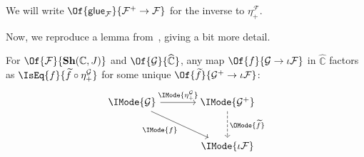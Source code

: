 \documentclass{article}
\newcommand\Psh[1]{\widehat{#1}}
\newcommand\Sh[1]{\mathbf{Sh} (#1)}
\newcommand\Plus[1]{{#1}^+}
\newcommand\Glue[1]{\mathsf{glue}_{#1}}
\begin{document}
\begin{notation}
  We will write
  $\Of{\Glue{\mathcal{F}}}{\Plus{\mathcal{F}}\to\mathcal{F}}$ for the
  inverse to $\eta_+^{\mathcal{F}}$.
\end{notation}

Now, we reproduce a lemma from~\cite{maclane-moerdijk:1992}, giving a
bit more detail.
\begin{lem}\label{lem:plus-factoring}
  For $\Of{\mathcal{F}}{\Sh{\mathbb{C},J}}$ and
  $\Of{\mathcal{G}}{\Psh{\mathbb{C}}}$, any map
  $\Of{f}{\mathcal{G}\to\iota\mathcal{F}}$ in $\Psh{\mathbb{C}}$ factors as
  $\IsEq{f}{\widetilde{f}\circ\eta_+^{\mathcal{G}}}$ for some unique
  $\Of{\widetilde{f}}{\Plus{\mathcal{G}}\to\iota\mathcal{F}}$:
  \begin{equation}\label{diagram:plus-f-tilde}
    \begin{tikzcd}[sep=large]
      \IMode{\mathcal{G}}
      \arrow[r,"\IMode{\eta_+^\mathcal{G}}"]
      \arrow[dr,swap,"\IMode{f}"]
      &
      \IMode{\Plus{\mathcal{G}}}
      \arrow[d,dashed,"\OMode{\widetilde{f}}"]
      \\
      &
      \IMode{\iota\mathcal{F}}
    \end{tikzcd}
  \end{equation}
\end{lem}
\end{document}
